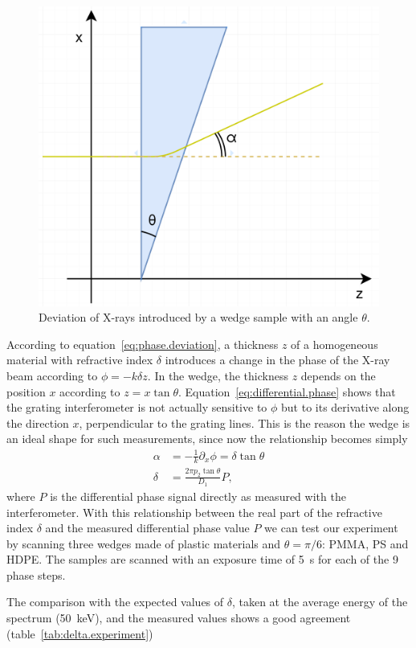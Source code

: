 \begin{figure}[htb]
    \centering
    \includegraphics[width=.5\textwidth]{gfx/wedge-deviation.png}
    \caption{Deviation of X-rays introduced by a wedge sample with an angle
    $\theta$.}
    \label{fig:wedge.deviation}
\end{figure}

According to equation~\eqref{eq:phase.deviation}, a thickness $z$ of a
homogeneous material with refractive index $\delta$ introduces a change in
the phase of the X-ray beam according to $\phi = -k\delta z$. In the wedge,
the thickness $z$ depends on the position $x$ according to $z = x\tan
\theta$. Equation~\eqref{eq:differential.phase} shows that the grating
interferometer is not actually sensitive to $\phi$ but to its derivative
along the direction $x$, perpendicular to the grating lines. This is the
reason the wedge is an ideal shape for such measurements, since now the
relationship becomes simply
\begin{align}
    \alpha &= -\frac{1}{k}\partial_x\phi = \delta\tan\theta\\
    \delta &= \frac{2 \pi p_2 \tan \theta}{D_1}P,
    \label{eq:measuring.differential.phase}
\end{align}
where $P$ is the differential phase signal directly as measured with the
interferometer. With this relationship between the real part of the
refractive index $\delta$ and the measured differential phase value $P$ we
can test our experiment by scanning three wedges made of plastic materials
and $\theta = \pi/6$: \ac{PMMA}, \ac{PS} and \ac{HDPE}.
The samples are scanned with an exposure time of \SI{5}{\second} for each of
the \num{9} phase steps.                 

The comparison with the expected values of $\delta$, taken at the average
energy of the spectrum (\SI{50}{\kilo\eV}), and the measured values shows a
good agreement (table~\ref{tab:delta.experiment})

